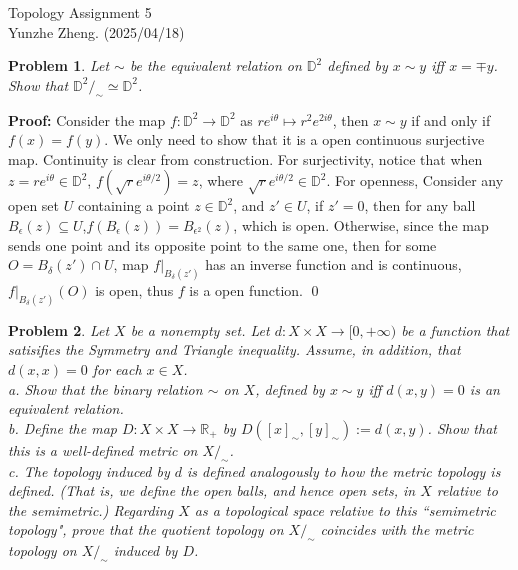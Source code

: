 \documentclass[12pt]{article}
\newtheorem{problem}{Problem}
\begin{document}
\noindent Topology \hfill Assignment 5\\
Yunzhe Zheng. (2025/04/18)

\hrulefill

\begin{problem}
Let $\sim$ be the equivalent relation on $\mathbb{D}^{2}$ defined by $x\sim y$ iff $x=\mp y$. Show that $\mathbb{D}^2/_\sim\simeq \mathbb{D}^2$.
\end{problem}

\textbf{Proof:} Consider the map $f: \mathbb{D}^2\to\mathbb{D}^2$ as $re^{i\theta}\mapsto r^2e^{2i\theta}$, then $x\sim y$ if and only if $f(x)=f(y)$. We only need to show that it is a open continuous surjective map. Continuity is clear from construction. For surjectivity, notice that when $z=re^{i\theta}\in\mathbb{D}^2$, $f(\sqrt{r}e^{i\theta/2})=z$, where $\sqrt{r}e^{i\theta/2}\in \mathbb{D}^2$. For openness, Consider any open set $U$ containing a point $z\in\mathbb{D}^2$, and $z'\in U$, if $z'=0$, then for any ball $B_{\epsilon}(z)\subseteq U$,$f(B_\epsilon(z))=B_{\epsilon^2}(z)$, which is open. Otherwise, since the map sends one point and its opposite point to the same one, then for some $O=B_{\delta}(z')\cap U$, map $f|_{B_{\delta}(z')}$ has an inverse function and is continuous, $f|_{B_{\delta}(z')}(O)$ is open, thus $f$ is a open function. \qed
\\
\begin{problem}
Let $X$ be a nonempty set. Let $d: X\times X\to [0,+\infty)$ be a function that satisifies the Symmetry and Triangle inequality. Assume, in addition, that $d(x,x)=0$ for each $x\in X$. \\
\indent a. Show that the binary relation $\sim$ on $X$, defined by $x\sim y$ iff $d(x,y)=0$ is an equivalent relation. \\
\indent b. Define the map $D: X\times X\to \mathbb{R}_{+}$ by $D([x]_{\sim}, [y]_{\sim}):= d(x,y)$. Show that this is a well-defined metric on $X/_\sim$. \\
\indent c. The topology induced by $d$ is defined analogously to how the metric topology is defined. (That is, we define the open balls, and hence open sets, in $X$ relative to the semimetric.) Regarding $X$ as a topological space relative to this ``semimetric topology", prove that the quotient topology on $X/_\sim$ coincides with the metric topology on $X/_\sim$ induced by $D$.
\end{problem}
\end{document}
